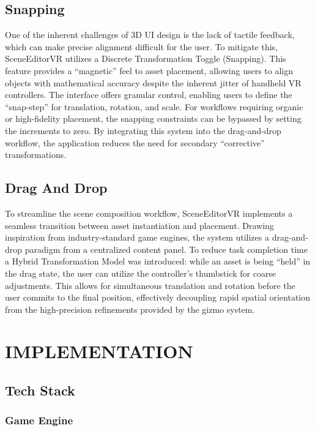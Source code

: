 \documentclass[inscr,ack,preface]{dithesis}
\begin{document}
\section{Snapping}

One of the inherent challenges of 3D UI design is the lack of tactile feedback, which can make precise alignment difficult for the user.
To mitigate this, SceneEditorVR utilizes a Discrete Transformation Toggle (Snapping). This feature provides a ``magnetic'' feel to asset
placement, allowing users to align objects with mathematical accuracy despite the inherent jitter of handheld VR controllers. The
interface offers granular control, enabling users to define the ``snap-step'' for translation, rotation, and scale. For workflows
requiring organic or high-fidelity placement, the snapping constraints can be bypassed by setting the increments to zero. By
integrating this system into the drag-and-drop workflow, the application reduces the need for secondary ``corrective'' transformations.

\section{Drag And Drop}

To streamline the scene composition workflow, SceneEditorVR implements a seamless transition between asset instantiation and placement.
Drawing inspiration from industry-standard game engines, the system utilizes a drag-and-drop paradigm from a centralized content panel.
To reduce task completion time a Hybrid Transformation Model was introduced: while an asset is being ``held'' in the drag state, the user
can utilize the controller’s thumbstick for coarse adjustments. This allows for simultaneous translation and rotation before
the user commits to the final position, effectively decoupling rapid spatial orientation from the high-precision refinements provided
by the gizmo system.

\chapter{IMPLEMENTATION}

\section{Tech Stack}

\subsection{Game Engine}
\end{document}
